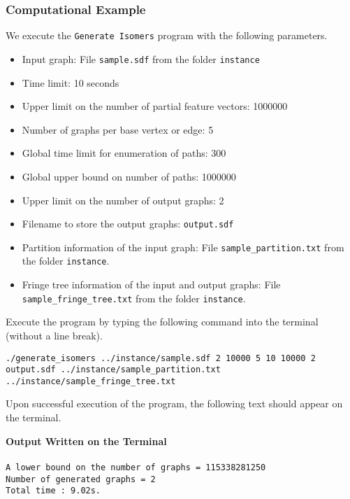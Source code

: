 \documentclass[11pt,titlepage,dvipdfmx,twoside]{article}
\begin{document}
\subsubsection{Computational Example}
\label{sec:instance_p}

We execute the {\tt Generate Isomers} program with the following parameters.

\begin{itemize}
\item Input graph: File {\tt sample.sdf} from the folder {\tt instance}
\item Time limit: 10 seconds
\item Upper limit on the number of partial feature vectors: 1000000
\item Number of graphs per base vertex or edge: 5
\item Global time limit for enumeration of paths: 300
\item Global upper bound on number of paths: 1000000
\item Upper limit on the number of output graphs: 2
\item Filename to store the output graphs: {\tt output.sdf}
\item Partition information of the input graph: 
File {\tt sample\_partition.txt} from the folder {\tt instance}.
\item Fringe tree information of the input and output graphs: 
File {\tt sample\_fringe\_tree.txt} from the folder {\tt instance}.
\end{itemize}

Execute the program by typing the following command into the terminal (without a line break).

\bigskip


{\tt ./generate\_isomers ../instance/sample.sdf 2 10000 5 10 10000 2} \\
 {\tt output.sdf ../instance/sample\_partition.txt }\\
 {\tt../instance/sample\_fringe\_tree.txt}
%
\bigskip

Upon successful execution of the program, the following text should appear on the terminal.

\begin{oframed}
{\bf Output Written on the Terminal}\\\\
{\tt A lower bound on the number of graphs = 115338281250\\
Number of generated graphs = 2\\
Total time : 9.02s.}
\end{oframed}
\end{document}
